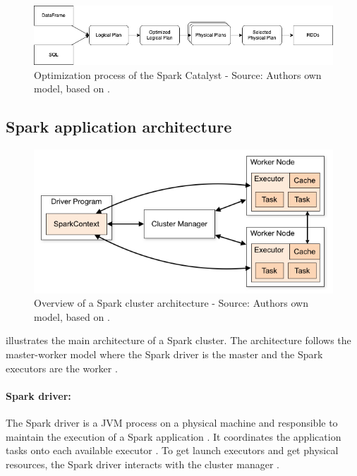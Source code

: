 \begin{figure}[h]%
\centering
\includegraphics[scale=0.5]{images/03_background/spark_catalyst}%
\caption{Optimization process of the Spark Catalyst - Source: Authors own model, based on \cite{Hien2018Spark}.}%
\label{fig:spark_catalyst_process}%
\end{figure}


\subsection{Spark application architecture}

\begin{figure}[h]%
\centering
\includegraphics[scale=0.5]{images/03_background/cluster_overview}%
\caption{Overview of a Spark cluster architecture - Source: Authors own model, based on \cite{Apache2020Spark}.}%
\label{fig:spark_cluster_overview}%
\end{figure}

 illustrates the main architecture of a Spark cluster. The architecture follows the master-worker model where the Spark driver is the master and the Spark executors are the worker \cite{Hien2018Spark}.

\paragraph{Spark driver:}
The Spark driver is a JVM process on a physical machine and responsible to maintain the execution of a Spark application \cite{Chambers2018Spark}. It coordinates the application tasks onto each available executor \cite{Hien2018Spark}. To get launch executors and get physical resources, the Spark driver interacts with the cluster manager \cite{Chambers2018Spark, Hien2018Spark}.


